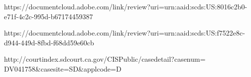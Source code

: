 \documentclass[a4paper]{arthur-letter}
\begin{document}
\begin{thebibliography}{}

https://documentcloud.adobe.com/link/review?uri=urn:aaid:scds:US:8016c2b0-e71f-4c2c-995d-b67174459387

https://documentcloud.adobe.com/link/review?uri=urn:aaid:scds:US:f7522e8c-d944-449d-8fbd-f68dd59e60cb

http://courtindex.sdcourt.ca.gov/CISPublic/casedetail?casenum= DV041758\&casesite=SD\&applcode=D

\end{thebibliography}
\end{document}
